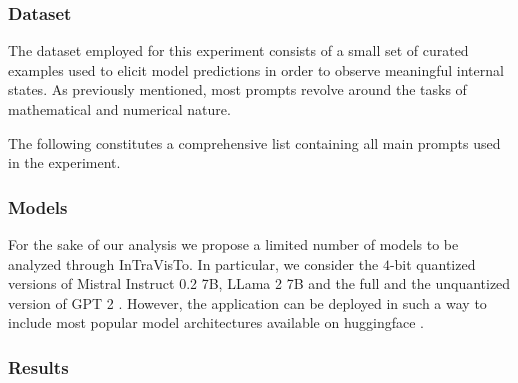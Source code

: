 \subsubsection{Dataset}

The dataset employed for this experiment consists of a small set of curated examples used to elicit model predictions in order to observe meaningful internal states.
As previously mentioned, most prompts revolve around the  tasks of mathematical and numerical nature.

The following constitutes a comprehensive list containing all main prompts used in the experiment.



\subsubsection{Models}

For the sake of our analysis we propose a limited number of models to be analyzed through InTraVisTo.
In particular, we consider the $4$-bit quantized versions of Mistral Instruct 0.2 7B, LLama 2 7B and the full and the unquantized version of GPT 2 .
However, the application can be deployed in such a way to include most popular model architectures available on huggingface .

\subsubsection{Results}

